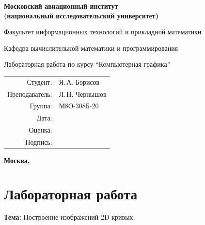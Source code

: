 \documentclass[12pt, a4paper]{article}
\begin{document}
	
	\begin{titlepage}
		
		\begin{center}
			
			\bfseries
			{\Large Московский авиационный институт\\ 
				(национальный исследовательский университет)}
			
			\vspace{48pt}
			{\large Факультет информационных технологий и прикладной 
				математики}
			
			\vspace{36pt}
			{\large Кафедра вычислительной математики и программирования}
			
			\vspace{48pt}
			Лабораторная работа  по курсу 
			\enquote{Компьютерная графика}
			
		\end{center}
		
		\vspace{72pt}
		\begin{flushright}
			\begin{tabular}{rl}
				Студент: & Я.\,А. Борисов \\
				Преподаватель: & Л.\,Н. Чернышов \\
				Группа: & М8О-308Б-20 \\
				Дата: & \\
				Оценка: & \\
				Подпись: & \\
			\end{tabular}
		\end{flushright}
		
		\vfill
		
		\begin{center}
			
			\bfseries
			Москва, \the\year
			
		\end{center}
		
	\end{titlepage}
	
	\pagebreak
	
	\section*{Лабораторная работа }
	
	\par\textbf{Тема: } {
		Построение изображений 2D-кривых.
	}
	
\end{document}
